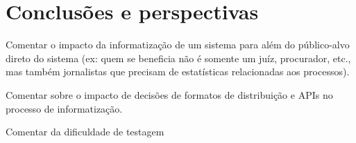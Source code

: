 \chapter{Conclusões e perspectivas~\label{chp:conclusions}}


\begin{todolist}
    \item Comentar o impacto da informatização de um sistema para além do
          público-alvo direto do sistema (ex: quem se beneficia não é somente
          um juíz, procurador, etc., mas também jornalistas que precisam de
          estatísticas relacionadas aos processos).
    \item Comentar sobre o impacto de decisões de formatos de distribuição e
          APIs no processo de informatização.
\end{todolist}

\begin{todolist}
    \item Comentar da dificuldade de testagem
\end{todolist}
